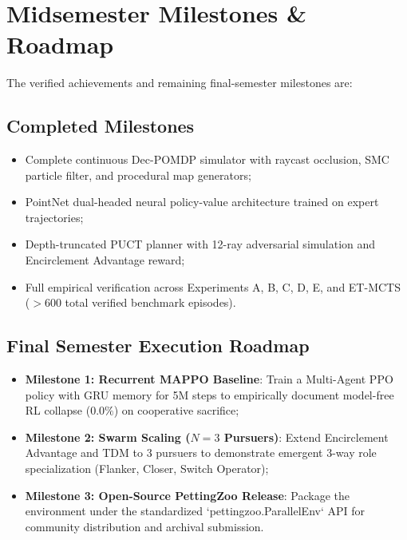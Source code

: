 \documentclass[conference]{IEEEtran}
\begin{document}
\section{Midsemester Milestones & Roadmap}
The verified achievements and remaining final-semester milestones are:

\subsection{Completed Milestones}
\begin{itemize}
    \item Complete continuous Dec-POMDP simulator with raycast occlusion, SMC particle filter, and procedural map generators;
    \item PointNet dual-headed neural policy-value architecture trained on expert trajectories;
    \item Depth-truncated PUCT planner with 12-ray adversarial simulation and Encirclement Advantage reward;
    \item Full empirical verification across Experiments A, B, C, D, E, and ET-MCTS ($>600$ total verified benchmark episodes).
\end{itemize}

\subsection{Final Semester Execution Roadmap}
\begin{itemize}
    \item \textbf{Milestone 1: Recurrent MAPPO Baseline}: Train a Multi-Agent PPO policy with GRU memory for 5M steps to empirically document model-free RL collapse ($0.0\%$) on cooperative sacrifice;
    \item \textbf{Milestone 2: Swarm Scaling ($N=3$ Pursuers)}: Extend Encirclement Advantage and TDM to 3 pursuers to demonstrate emergent 3-way role specialization (Flanker, Closer, Switch Operator);
    \item \textbf{Milestone 3: Open-Source PettingZoo Release}: Package the environment under the standardized `pettingzoo.ParallelEnv` API for community distribution and archival submission.
\end{itemize}
\end{document}
